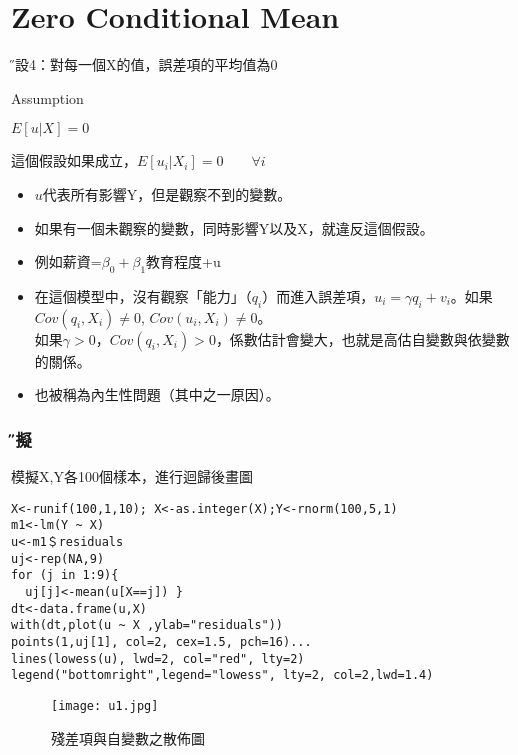 \documentclass[xcolor=dvipsnames]{beamer}
\begin{document}
\section{Zero Conditional Mean}
\begin{frame}{\H 假設4：對每一個X的值，誤差項的平均值為0}
\begin{block}{Assumption}
\begin{center}
$E[u|X]=0$
\end{center}
這個假設如果成立，$ E[u_{i}|X_{i}]=0 \qquad\forall i$
\end{block}
\begin{itemize}
\item $ u $代表所有影響Y，但是觀察不到的變數。\\
\item 如果有一個未觀察的變數，同時影響Y以及X，就違反這個假設。
\item 例如薪資=$\beta_{0}+\beta_{1}$教育程度+u
\item 在這個模型中，沒有觀察「能力」（$q_{i}$）而進入誤差項，$u_{i}=\gamma q_{i}+v_{i}$。如果$ Cov(q_{i},X_{i})\neq 0$, $ Cov(u_{i},X_{i})\neq 0$。 \\
如果$ \gamma>0 $，$ Cov(q_{i},X_{i})> 0$，係數估計會變大，也就是高估自變數與依變數的關係。
\item 也被稱為內生性問題（其中之一原因）。
\end{itemize}
\end{frame}
\begin{frame}[fragile=singleslide]\frametitle{\H 模擬}
模擬X,Y各100個樣本，進行迴歸後畫圖
\begin{Verbatim}[frame=single,label=R code,
formatcom=\color{blue},fontseries=b,xleftmargin=2mm]
X<-runif(100,1,10); X<-as.integer(X);Y<-rnorm(100,5,1)
m1<-lm(Y ~ X)
u<-m1＄residuals
uj<-rep(NA,9)
for (j in 1:9){
  uj[j]<-mean(u[X==j]) }
dt<-data.frame(u,X)
with(dt,plot(u ~ X ,ylab="residuals"))
points(1,uj[1], col=2, cex=1.5, pch=16)...
lines(lowess(u), lwd=2, col="red", lty=2)
legend("bottomright",legend="lowess", lty=2, col=2,lwd=1.4)
\end{Verbatim}
\end{frame}
\begin{frame}
\begin{figure}
\texttt{[image: u1.jpg]}
\caption{殘差項與自變數之散佈圖}
\end{figure}
\end{frame}
\end{document}

